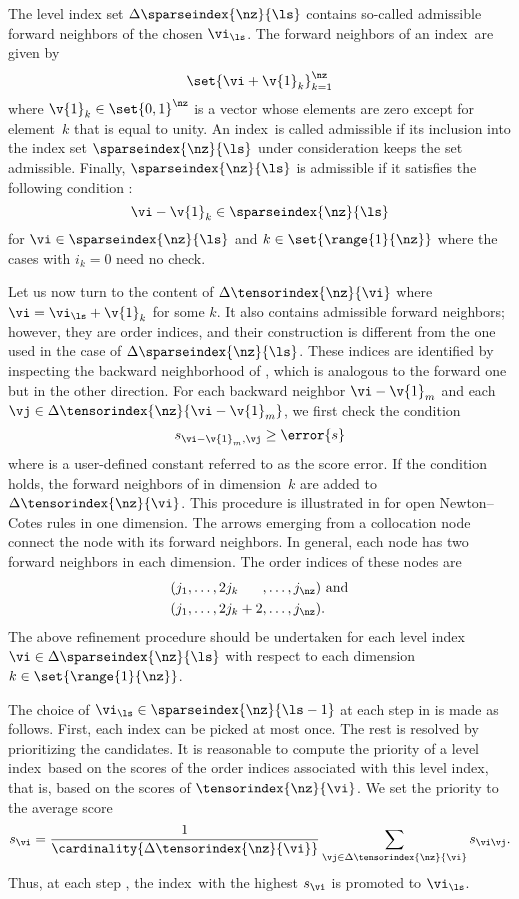 The level index set $\Delta\sparseindex{\nz}{\ls}$ contains so-called admissible
forward neighbors of the chosen $\vi_{\ls}$. The forward neighbors of an
index~\vi are given by
\[
  \set{\vi + \v{1}_k}_{k = 1}^\nz
\]
where $\v{1}_k \in \set{0, 1}^\nz$ is a vector whose elements are zero except
for element~$k$ that is equal to unity. An index~\vi is called admissible if its
inclusion into the index set $\sparseindex{\nz}{\ls}$ under consideration keeps
the set admissible. Finally, $\sparseindex{\nz}{\ls}$ is admissible if it
satisfies the following condition \cite{klimke2006}:
\[
  \vi - \v{1}_k \in \sparseindex{\nz}{\ls}
\]
for $\vi \in \sparseindex{\nz}{\ls}$ and $k \in \set{\range{1}{\nz}}$ where the
cases with $i_k = 0$ need no check.

Let us now turn to the content of $\Delta\tensorindex{\nz}{\vi}$ where $\vi =
\vi_{\ls} + \v{1}_k$ for some $k$. It also contains admissible forward
neighbors; however, they are order indices, and their construction is different
from the one used in the case of $\Delta\sparseindex{\nz}{\ls}$. These indices
are identified by inspecting the backward neighborhood of \vi, which is
analogous to the forward one but in the other direction. For each backward
neighbor $\vi - \v{1}_m$ and each $\vj \in \Delta\tensorindex{\nz}{\vi -
\v{1}_m}$, we first check the condition
\[
  s_{\vi - \v{1}_m, \vj} \geq \error{s}
\]
where  is a user-defined constant referred to as the score error. If
the condition holds, the forward neighbors of \vj in dimension~$k$ are added to
$\Delta\tensorindex{\nz}{\vi}$. This procedure is illustrated in
 for open Newton--Cotes rules in one dimension. The arrows
emerging from a collocation node connect the node with its forward neighbors. In
general, each node has two forward neighbors in each dimension. The order
indices of these nodes are
\begin{align*}
  & (j_1, \dots, 2 j_k \phantom{{} + 2}, \dots, j_{\nz}) \text{ and} \\
  & (j_1, \dots, 2 j_k + 2,              \dots, j_{\nz}).
\end{align*}
The above refinement procedure should be undertaken for each level index $\vi
\in \Delta\sparseindex{\nz}{\ls}$ with respect to each dimension $k \in
\set{\range{1}{\nz}}$.

The choice of $\vi_{\ls} \in \sparseindex{\nz}{\ls - 1}$ at each step \ls in
 is made as follows. First, each index can be picked at
most once. The rest is resolved by prioritizing the candidates. It is reasonable
to compute the priority of a level index~\vi based on the scores of the order
indices associated with this level index, that is, based on the scores of
$\tensorindex{\nz}{\vi}$. We set the priority to the average score
\[
  s_{\vi} = \frac{1}{\cardinality{\Delta\tensorindex{\nz}{\vi}}} \sum_{\vj \in \Delta\tensorindex{\nz}{\vi}} s_{\vi \vj}.
\]
Thus, at each step \ls, the index~\vi with the highest $s_{\vi}$ is promoted to
$\vi_{\ls}$.


